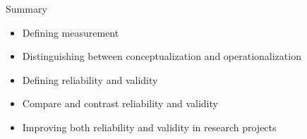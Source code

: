 \begin{center}
	\begin{tkawybox}{Summary}
		\begin{itemize}
			\setlength{\itemsep}{0pt}
			\setlength{\parskip}{0pt}
			\setlength{\parsep}{0pt}
			
			\item Defining measurement
			\item Distinguishing between conceptualization and operationalization
			\item Defining reliability and validity 
			\item Compare and contrast reliability and validity
			\item Improving both reliability and validity in research projects
		\end{itemize}
	\end{tkawybox}
\end{center}
